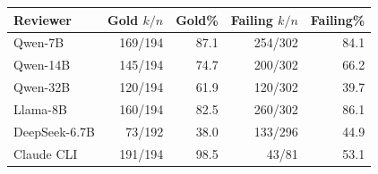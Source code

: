 \begin{tabular}{lrrrr}
\toprule
Reviewer & Gold $k/n$ & Gold\% & Failing $k/n$ & Failing\% \\
\midrule
Qwen-7B & 169/194 & 87.1 & 254/302 & 84.1 \\
Qwen-14B & 145/194 & 74.7 & 200/302 & 66.2 \\
Qwen-32B & 120/194 & 61.9 & 120/302 & 39.7 \\
Llama-8B & 160/194 & 82.5 & 260/302 & 86.1 \\
DeepSeek-6.7B & 73/192 & 38.0 & 133/296 & 44.9 \\
Claude CLI & 191/194 & 98.5 & 43/81 & 53.1 \\
\bottomrule
\end{tabular}
